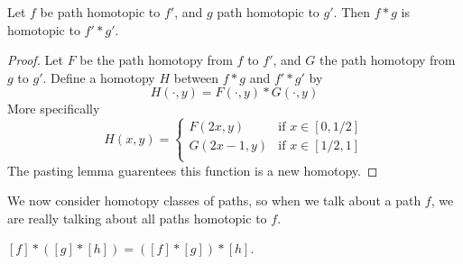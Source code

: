 \begin{theorem}
    Let $f$ be path homotopic to $f'$, and $g$ path homotopic to $g'$. Then $f * g$ is homotopic to $f' * g'$.
\end{theorem}
\begin{proof}
    Let $F$ be the path homotopy from $f$ to $f'$, and $G$ the path homotopy from $g$ to $g'$. Define a homotopy $H$ between $f * g$ and $f' * g'$ by
    \[ H(\cdot,y) = F(\cdot, y) * G(\cdot, y) \]
    More specifically
    \[ H(x,y) = \begin{cases}
        F(2x,y) & \text{if } x \in [0,1/2]\\
        G(2x - 1,y) & \text{if } x \in [1/2,1]\\
\end{cases} \]
    The pasting lemma guarentees this function is a new homotopy.
\end{proof}

We now consider homotopy classes of paths, so when we talk about a path $f$, we are really talking about all paths homotopic to $f$.

\begin{theorem}
    $[f] * ([g] * [h]) = ([f] * [g]) * [h]$.
\end{theorem}

